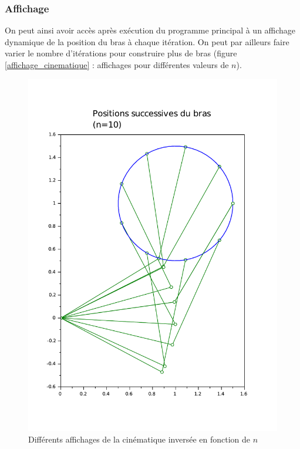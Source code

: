 \documentclass[a4paper,10pt]{report}
\begin{document}
\subsubsection{Affichage}
On peut ainsi avoir accès après exécution du programme principal à un affichage dynamique de la position du bras à chaque itération. On peut par ailleurs faire varier le nombre d'itérations pour construire plus de bras (figure \ref{affichage_cinematique} : affichages pour différentes valeurs de $n$).
\begin{figure}[H]
\caption{Différents affichages de la cinématique inversée en fonction de $n$}
   \begin{minipage}[c]{.48\linewidth}
   \centering
      \includegraphics[width=\textwidth]{graphcinematique.pdf}
   \end{minipage} \hfill
   \begin{minipage}[c]{.48\linewidth}

\end{minipage}
\end{figure}
\end{document}
